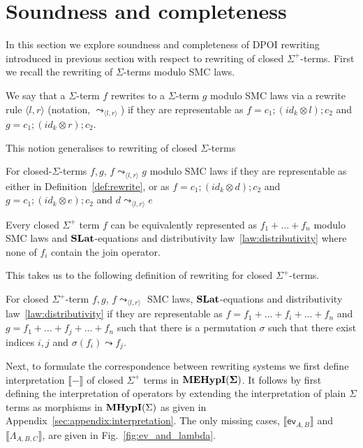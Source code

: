 \section{Soundness and completeness}

In this section we explore soundness and completeness of DPOI rewriting introduced in previous section with respect to rewriting of closed $\Sigma^{+}$-terms.
First we recall the rewriting of $\Sigma$-terms modulo SMC laws.

\begin{definition}
\label{def:rewrite}
    We say that a $\Sigma$-term $f$ rewrites to a $\Sigma$-term $g$ modulo SMC laws via a rewrite rule $\langle l, r \rangle$ (notation, $\leadsto_{\langle l, r \rangle}$) if they are representable as
    $
    f = c_{1};(id_{k} \otimes l);c_{2} $ and $ g = c_{1};(id_{k} \otimes r);c_{2}
    $.
\end{definition}
This notion generalises to rewriting of closed $\Sigma$-terms
\begin{definition}
    For closed-$\Sigma$-terms $f,g$, $f \leadsto_{\langle l, r \rangle} g$ modulo SMC laws if they are representable as either in Definition~\ref{def:rewrite}, or as 
    $
    f = c_{1};(id_{k} \otimes d);c_{2} $ and $ g = c_{1};(id_{k} \otimes e);c_{2}
    $
    and $d \leadsto_{\langle l, r \rangle} e$
\end{definition}
\begin{lemma}
\label{lemma:normal_form}
    Every closed $\Sigma^{+}$ term $f$ can be equivalently represented as
    $
    f_{1} + \ldots + f_{n}
    $ modulo SMC laws and $\mathbf{SLat}$-equations and distributivity law~\ref{law:distributivity} where none of $f_{i}$ contain the join operator.
\end{lemma}
This takes us to the following definition of rewriting for closed $\Sigma^{+}$-terms.
\begin{definition}
    For closed $\Sigma^{+}$-term $f,g$, $f \leadsto_{\langle l, r \rangle}$ SMC laws, $\mathbf{SLat}$-equations and distributivity law~\ref{law:distributivity} if they are representable as
    $
    f = f_{1} + \ldots + f_{i} + \ldots + f_{n} $ and $ g = f_{1} + \ldots + f_{j} + \ldots + f_{n}
    $
    such that there is a permutation $\sigma$ such that there exist indices $i,j$ and $\sigma(f_{i}) \leadsto f_{j}$.
\end{definition}
Next, to formulate the correspondence between rewriting systems we first define interpretation $\llbracket - \rrbracket$ of closed $\Sigma^{+}$ terms in ${\mathbf{MEHypI(\Sigma)}}$.
It follows by first defining the interpretation of operators by extending the interpretation of plain $\Sigma$ terms as morphisms in $\textbf{MHypI}(\Sigma)$ as given in Appendix~\ref{sec:appendix:interpretation}.
The only missing cases, $\llbracket \textsf{ev}_{A,B} \rrbracket$ and $\llbracket \Lambda_{A,B,C} \rrbracket$, are given in Fig.~\ref{fig:ev_and_lambda}.

